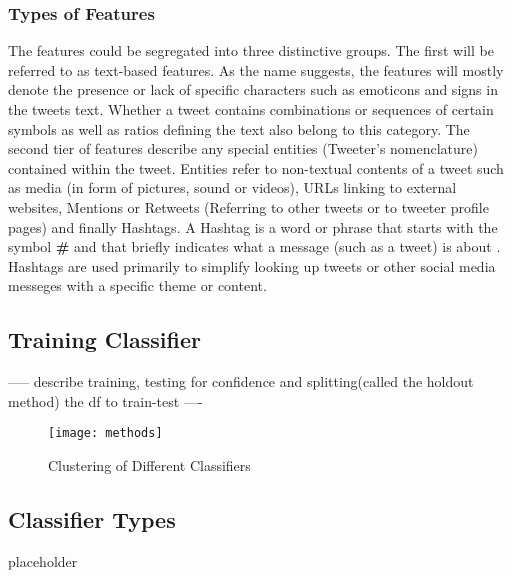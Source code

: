 		\subsubsection*{Types of Features}
		The features could be segregated into three distinctive groups. The first will be referred to as text-based features. As the name suggests, the features will mostly denote the presence or lack of specific characters such as emoticons and signs in the tweets text. Whether a tweet contains combinations or sequences of certain symbols as well as ratios defining the text also belong to this category.
		The second tier of features describe any special entities (Tweeter's nomenclature) contained within the tweet. Entities refer to non-textual contents of a tweet such as media (in form of pictures, sound or videos), URLs linking to external websites, Mentions or Retweets (Referring to other tweets or to tweeter profile pages) and finally Hashtags. A Hashtag is a word or phrase that starts with the symbol \textbf{\#} and that briefly indicates what a message (such as a tweet) is about \cite{dict_tweet}. Hashtags are used primarily to simplify looking up tweets or other social media messeges with a specific theme or content.
		
	\subsection{Training Classifier}	
	{\Large \color{red} ----- describe training, testing for confidence and splitting(called the holdout method) the df to train-test ----}
	\begin{figure}[h]
		
		\centering
		\texttt{[image: methods]}
		\caption{Clustering of Different Classifiers}
	\end{figure}

	\subsection{Classifier Types}
		{\color{red} \Large placeholder}
	
	
	
		
		
		
		